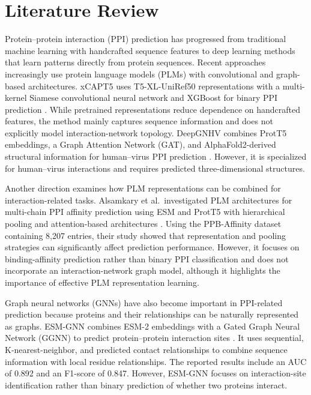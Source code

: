 \documentclass[conference]{IEEEtran}
\begin{document}
\section{Literature Review}\label{sec:related}
Protein--protein interaction (PPI) prediction has progressed from traditional
machine learning with handcrafted sequence features to deep learning methods
that learn patterns directly from protein sequences. Recent approaches
increasingly use protein language models (PLMs) with convolutional and
graph-based architectures. xCAPT5 uses T5-XL-UniRef50 representations with a
multi-kernel Siamese convolutional neural network and XGBoost for binary PPI
prediction \cite{b5}. While pretrained representations reduce dependence on
handcrafted features, the method mainly captures sequence information and does
not explicitly model interaction-network topology. DeepGNHV combines ProtT5
embeddings, a Graph Attention Network (GAT), and AlphaFold2-derived structural
information for human--virus PPI prediction \cite{b6}. However, it is
specialized for human--virus interactions and requires predicted
three-dimensional structures.

Another direction examines how PLM representations can be combined for
interaction-related tasks. Alsamkary et al.\ investigated PLM architectures for
multi-chain PPI affinity prediction using ESM and ProtT5 with hierarchical
pooling and attention-based architectures \cite{b7}. Using the PPB-Affinity
dataset containing 8,207 entries, their study showed that representation and
pooling strategies can significantly affect prediction performance. However,
it focuses on binding-affinity prediction rather than binary PPI
classification and does not incorporate an interaction-network graph model,
although it highlights the importance of effective PLM representation
learning.

Graph neural networks (GNNs) have also become important in PPI-related
prediction because proteins and their relationships can be naturally
represented as graphs. ESM-GNN combines ESM-2 embeddings with a Gated Graph
Neural Network (GGNN) to predict protein--protein interaction sites
\cite{b8}. It uses sequential, K-nearest-neighbor, and predicted contact
relationships to combine sequence information with local residue
relationships. The reported results include an AUC of 0.892 and an F1-score of
0.847. However, ESM-GNN focuses on interaction-site identification rather than
binary prediction of whether two proteins interact.
\end{document}
